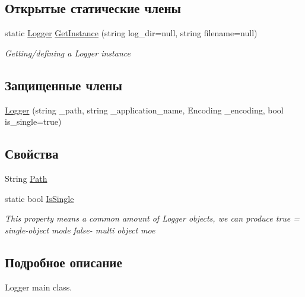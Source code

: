 \subsection*{Открытые статические члены}
\begin{DoxyCompactItemize}
\item 
static \hyperlink{class_logger_1_1_logger}{Logger} \hyperlink{class_logger_1_1_logger_aed336728b69e8cbc0d8b29380c27fec0}{Get\+Instance} (string log\+\_\+dir=null, string filename=null)
\begin{DoxyCompactList}\small\item\em Getting/defining a Logger instance \end{DoxyCompactList}\end{DoxyCompactItemize}
\subsection*{Защищенные члены}
\begin{DoxyCompactItemize}
\item 
\hyperlink{class_logger_1_1_logger_a545546c79c39f7d96d134b78f36a853e}{Logger} (string \+\_\+path, string \+\_\+application\+\_\+name, Encoding \+\_\+encoding, bool is\+\_\+single=true)
\end{DoxyCompactItemize}
\subsection*{Свойства}
\begin{DoxyCompactItemize}
\item 
String \hyperlink{class_logger_1_1_logger_aed778c812410fe2990563386ea12da16}{Path}
\item 
static bool \hyperlink{class_logger_1_1_logger_a4895fc0515058056ca5e6ec929b57d51}{Is\+Single}
\begin{DoxyCompactList}\small\item\em This property means a common amount of Logger objects, we can produce true = single-\/object mode false-\/ multi object moe \end{DoxyCompactList}\end{DoxyCompactItemize}


\subsection{Подробное описание}
Logger main class. 




